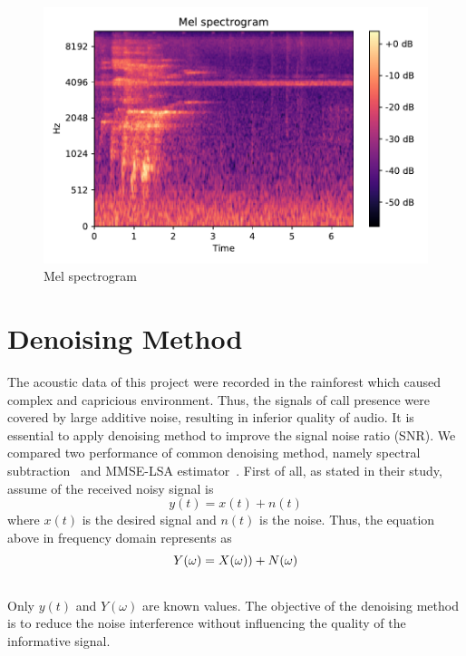 \begin{figure}[htp]
\centering
  \includegraphics[scale=0.7]{Figs/chap3/mel_spec.pdf}
  \caption{Mel spectrogram}
 \label{fig:mel_spec}
\end{figure}
\section{Denoising Method}
The acoustic data of this project were recorded in the rainforest which caused complex and capricious environment. Thus, the signals of call presence were covered by large additive noise, resulting in inferior quality of audio. It is essential to apply denoising method to improve the signal noise ratio (SNR). We compared two performance of common denoising method, namely spectral subtraction~\cite{boll1979suppression} and MMSE-LSA estimator~\cite{ephraim1985speech}. First of all, as stated in their study, assume of the received noisy signal is 
\begin{equation}
y(t)=x(t)+n(t)
\end{equation}
where $x(t)$ is the desired signal and $n(t)$ is the noise. Thus, the equation above in frequency domain represents as
\begin{align}
Y(\omega)&=X(\omega))+N(\omega)\label{eq:spectrum}
\\
\notag
\end{align}
Only $y(t)$ and $Y(\omega)$ are known values. The objective of the denoising method is to reduce the noise interference without influencing the quality of the informative signal.
